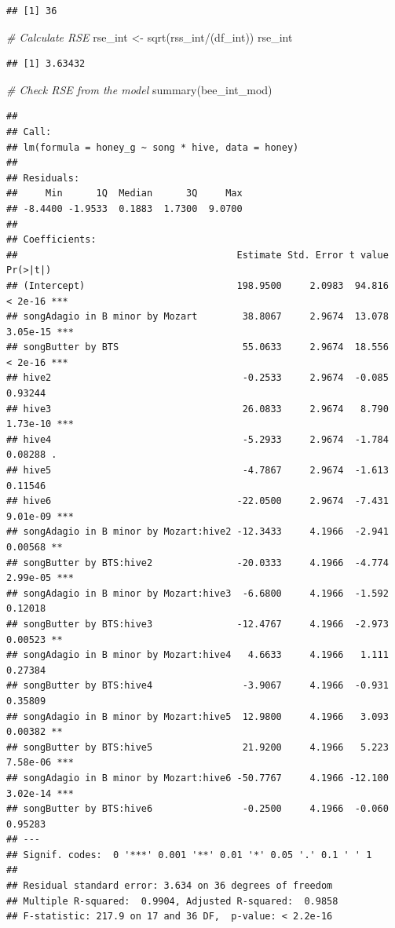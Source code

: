 \documentclass[
  openany]{book}
\newenvironment{Shaded}{\begin{snugshade}}{\end{snugshade}}
\newcommand{\CommentTok}[1]{\textcolor[rgb]{0.56,0.35,0.01}{\textit{#1}}}
\newcommand{\FunctionTok}[1]{\textcolor[rgb]{0.00,0.00,0.00}{#1}}
\newcommand{\NormalTok}[1]{#1}
\newcommand{\OtherTok}[1]{\textcolor[rgb]{0.56,0.35,0.01}{#1}}
\newcommand{\SpecialCharTok}[1]{\textcolor[rgb]{0.00,0.00,0.00}{#1}}
\begin{document}
\begin{verbatim}
## [1] 36
\end{verbatim}

\begin{Shaded}
\begin{Highlighting}[]
\CommentTok{\# Calculate RSE}
\NormalTok{rse\_int }\OtherTok{\textless{}{-}} \FunctionTok{sqrt}\NormalTok{(rss\_int}\SpecialCharTok{/}\NormalTok{(df\_int))}
\NormalTok{rse\_int}
\end{Highlighting}
\end{Shaded}

\begin{verbatim}
## [1] 3.63432
\end{verbatim}

\begin{Shaded}
\begin{Highlighting}[]
\CommentTok{\# Check RSE from the model}
\FunctionTok{summary}\NormalTok{(bee\_int\_mod)}
\end{Highlighting}
\end{Shaded}

\begin{verbatim}
## 
## Call:
## lm(formula = honey_g ~ song * hive, data = honey)
## 
## Residuals:
##     Min      1Q  Median      3Q     Max 
## -8.4400 -1.9533  0.1883  1.7300  9.0700 
## 
## Coefficients:
##                                       Estimate Std. Error t value Pr(>|t|)    
## (Intercept)                           198.9500     2.0983  94.816  < 2e-16 ***
## songAdagio in B minor by Mozart        38.8067     2.9674  13.078 3.05e-15 ***
## songButter by BTS                      55.0633     2.9674  18.556  < 2e-16 ***
## hive2                                  -0.2533     2.9674  -0.085  0.93244    
## hive3                                  26.0833     2.9674   8.790 1.73e-10 ***
## hive4                                  -5.2933     2.9674  -1.784  0.08288 .  
## hive5                                  -4.7867     2.9674  -1.613  0.11546    
## hive6                                 -22.0500     2.9674  -7.431 9.01e-09 ***
## songAdagio in B minor by Mozart:hive2 -12.3433     4.1966  -2.941  0.00568 ** 
## songButter by BTS:hive2               -20.0333     4.1966  -4.774 2.99e-05 ***
## songAdagio in B minor by Mozart:hive3  -6.6800     4.1966  -1.592  0.12018    
## songButter by BTS:hive3               -12.4767     4.1966  -2.973  0.00523 ** 
## songAdagio in B minor by Mozart:hive4   4.6633     4.1966   1.111  0.27384    
## songButter by BTS:hive4                -3.9067     4.1966  -0.931  0.35809    
## songAdagio in B minor by Mozart:hive5  12.9800     4.1966   3.093  0.00382 ** 
## songButter by BTS:hive5                21.9200     4.1966   5.223 7.58e-06 ***
## songAdagio in B minor by Mozart:hive6 -50.7767     4.1966 -12.100 3.02e-14 ***
## songButter by BTS:hive6                -0.2500     4.1966  -0.060  0.95283    
## ---
## Signif. codes:  0 '***' 0.001 '**' 0.01 '*' 0.05 '.' 0.1 ' ' 1
## 
## Residual standard error: 3.634 on 36 degrees of freedom
## Multiple R-squared:  0.9904, Adjusted R-squared:  0.9858 
## F-statistic: 217.9 on 17 and 36 DF,  p-value: < 2.2e-16
\end{verbatim}
\end{document}
